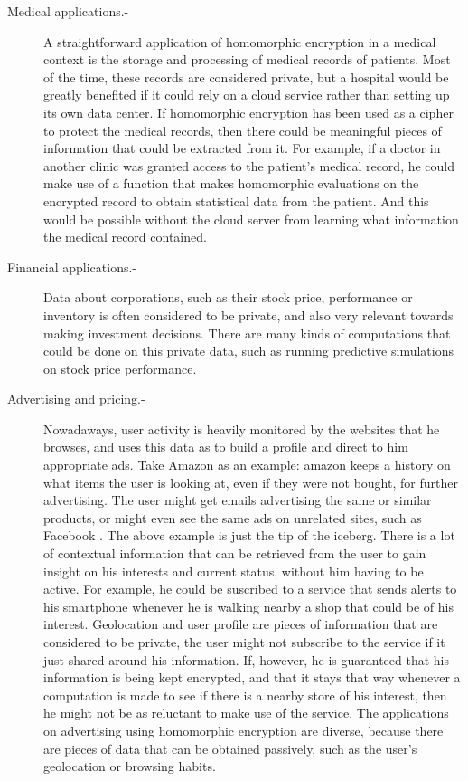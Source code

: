 \begin{description}
\item[Medical applications.-] A straightforward application of homomorphic encryption in a medical context is the storage and processing of medical records of patients. Most of the time, these records are considered private, but a hospital would be greatly benefited if it could rely on a cloud service rather than setting up its own data center. If homomorphic encryption has been used as a cipher to protect the medical records, then there could be meaningful pieces of information that could be extracted from it. For example, if a doctor in another clinic was granted access to the patient's medical record, he could make use of a function that makes homomorphic evaluations on the encrypted record to obtain statistical data from the patient. And this would be possible without the cloud server from learning what information the medical record contained.
\item[Financial applications.-] Data about corporations, such as their stock price, performance or inventory is often considered to be private, and also very relevant towards making investment decisions. There are many kinds of computations that could be done on this private data, such as running predictive simulations on stock price performance. 
\item[Advertising and pricing.-] Nowadaways, user activity is heavily monitored by the websites that he browses, and uses this data as to build a profile and direct to him appropriate ads. Take Amazon as an example: amazon keeps a history on what items the user is looking at, even if they were not bought, for further advertising. The user might get emails advertising the same or similar products, or might even see the same ads on unrelated sites, such as Facebook \cite{KimMai}. 
  The above example is just the tip of the iceberg. There is a lot of contextual information that can be retrieved from the user to gain insight on his interests and current status, without him having to be active. For example, he could be suscribed to a service that sends alerts to his smartphone whenever he is walking nearby a shop that could be of his interest. Geolocation and user profile are pieces of information that are considered to be private, the user might not subscribe to the service if it just shared around his information. If, however, he is guaranteed that his information is being kept encrypted, and that it stays that way whenever a computation is made to see if there is a nearby store of his interest, then he might not be as reluctant to make use of the service. The applications on advertising using homomorphic encryption are diverse, because there are pieces of data that can be obtained passively, such as the user's geolocation or browsing habits.

\end{description}
